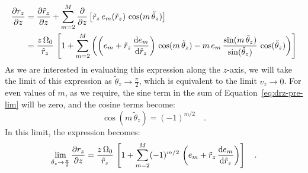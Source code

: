 \documentclass[modern]{aastex631}
\newcommand{\freqzero}{\ensuremath{\Omega_0}}
\newcommand{\mmax}{\ensuremath{M}}
\newcommand{\rz}{\ensuremath{r_z}}
\newcommand{\rzp}{\ensuremath{\tilde{r}_z}}
\newcommand{\thzp}{\ensuremath{\tilde{\theta}_z}}
\begin{document}
\begin{align}
    \frac{\partial \rz}{\partial z} &=
        \frac{\partial \rzp}{\partial z} +
        \sum_{m=2}^{\mmax} \frac{\partial}{\partial z}
            \left[\rzp \, e_m(\rzp) \, \cos(m \, \thzp)\right]\\
    &= \frac{z\,\freqzero}{\rzp} \, \left[
        1 + \sum_{m=2}^{\mmax} \left(
            \left(e_m + \rzp \, \deriv{e_m}{\rzp}\right) \,
                \cos(m \, \thzp) -
            m \, e_m \, \frac{\sin(m \, \thzp)}{\sin(\thzp)} \, \cos(\thzp)
        \right)
    \right] \label{eq:drz-pre-lim}
\end{align}
As we are interested in evaluating this expression along the $z$-axis, we will take the
limit of this expression as $\thzp \to \frac{\pi}{2}$, which is equivalent to the limit
$v_z \to 0$.
For even values of $m$, as we require, the sine term in the sum of Equation~\ref{eq:drz-pre-lim} will be zero, and the cosine terms become:
\begin{equation}
    \cos(m \, \thzp) = (-1)^{m/2} \quad .
\end{equation}
In this limit, the expression becomes:
\begin{equation}
    \lim_{\thzp \to \frac{\pi}{2}} \pderiv{\rz}{z} =
        \frac{z\,\freqzero}{\rzp} \, \left[
            1 + \sum_{m=2}^{\mmax} (-1)^{m/2} \,
                \left(e_m + \rzp \, \deriv{e_m}{\rzp}\right)
        \right] \quad .
\end{equation}
\end{document}
